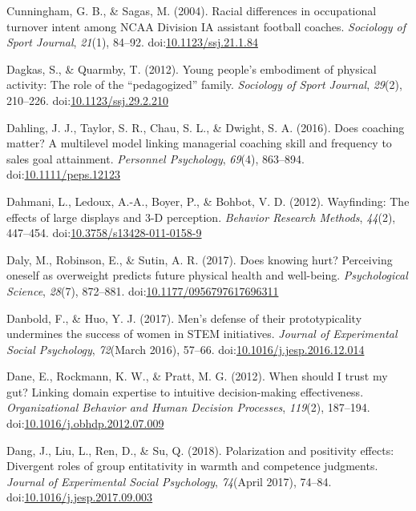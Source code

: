 \documentclass[english,man]{apa6}
\theoremstyle{definition}
\theoremstyle{definition}
\theoremstyle{definition}
\theoremstyle{remark}
\begin{document}
\hypertarget{ref-Cunningham2004}{}
Cunningham, G. B., \& Sagas, M. (2004). Racial differences in
occupational turnover intent among NCAA Division IA assistant football
coaches. \emph{Sociology of Sport Journal}, \emph{21}(1), 84--92.
doi:\href{https://doi.org/10.1123/ssj.21.1.84}{10.1123/ssj.21.1.84}

\hypertarget{ref-Dagkas2012}{}
Dagkas, S., \& Quarmby, T. (2012). Young people's embodiment of physical
activity: The role of the ``pedagogized'' family. \emph{Sociology of
Sport Journal}, \emph{29}(2), 210--226.
doi:\href{https://doi.org/10.1123/ssj.29.2.210}{10.1123/ssj.29.2.210}

\hypertarget{ref-Dahling2016}{}
Dahling, J. J., Taylor, S. R., Chau, S. L., \& Dwight, S. A. (2016).
Does coaching matter? A multilevel model linking managerial coaching
skill and frequency to sales goal attainment. \emph{Personnel
Psychology}, \emph{69}(4), 863--894.
doi:\href{https://doi.org/10.1111/peps.12123}{10.1111/peps.12123}

\hypertarget{ref-Dahmani2012}{}
Dahmani, L., Ledoux, A.-A., Boyer, P., \& Bohbot, V. D. (2012).
Wayfinding: The effects of large displays and 3-D perception.
\emph{Behavior Research Methods}, \emph{44}(2), 447--454.
doi:\href{https://doi.org/10.3758/s13428-011-0158-9}{10.3758/s13428-011-0158-9}

\hypertarget{ref-Daly2017}{}
Daly, M., Robinson, E., \& Sutin, A. R. (2017). Does knowing hurt?
Perceiving oneself as overweight predicts future physical health and
well-being. \emph{Psychological Science}, \emph{28}(7), 872--881.
doi:\href{https://doi.org/10.1177/0956797617696311}{10.1177/0956797617696311}

\hypertarget{ref-Danbold2017}{}
Danbold, F., \& Huo, Y. J. (2017). Men's defense of their
prototypicality undermines the success of women in STEM initiatives.
\emph{Journal of Experimental Social Psychology}, \emph{72}(March 2016),
57--66.
doi:\href{https://doi.org/10.1016/j.jesp.2016.12.014}{10.1016/j.jesp.2016.12.014}

\hypertarget{ref-Dane2012}{}
Dane, E., Rockmann, K. W., \& Pratt, M. G. (2012). When should I trust
my gut? Linking domain expertise to intuitive decision-making
effectiveness. \emph{Organizational Behavior and Human Decision
Processes}, \emph{119}(2), 187--194.
doi:\href{https://doi.org/10.1016/j.obhdp.2012.07.009}{10.1016/j.obhdp.2012.07.009}

\hypertarget{ref-Dang2018}{}
Dang, J., Liu, L., Ren, D., \& Su, Q. (2018). Polarization and
positivity effects: Divergent roles of group entitativity in warmth and
competence judgments. \emph{Journal of Experimental Social Psychology},
\emph{74}(April 2017), 74--84.
doi:\href{https://doi.org/10.1016/j.jesp.2017.09.003}{10.1016/j.jesp.2017.09.003}
\end{document}
